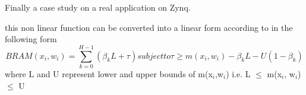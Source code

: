 \documentclass[conference]{IEEEtran}
\begin{document}
Finally a case study on a real application on Zynq. 

this non linear function can be converted into a linear form according to \cite{1} in the following form
\begin{equation}
BRAM(x_i,w_i) = \sum_{k=0}^{H-1} (\beta_k L + \tau)
subject to
\tau \geq m(x_i, w_i)- \beta_k L -U(1-\beta_k)
\end{equation}
where L and U represent lower and upper bounds of m(x$_i$,w$_i$) i.e. L $\leq$ m(x$_i$, w$_i$) $\leq$ U
\end{document}
